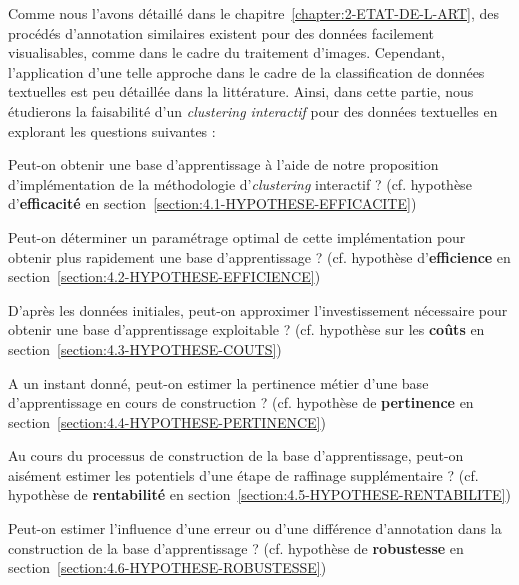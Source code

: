 	Comme nous l'avons détaillé dans le chapitre~\ref{chapter:2-ETAT-DE-L-ART}, des procédés d'annotation similaires existent pour des données facilement visualisables, comme dans le cadre du traitement d'images. Cependant, l'application d'une telle approche dans le cadre de la classification de données textuelles est peu détaillée dans la littérature. Ainsi, dans cette partie, nous étudierons la faisabilité d'un \textit{clustering interactif} pour des données textuelles en explorant les questions suivantes :
	\begin{leftBarImportantRed}
		\begin{todolist}
			\item Peut-on obtenir une base d'apprentissage à l'aide de notre proposition d'implémentation de la méthodologie d'\textit{clustering} interactif ? (cf. hypothèse d'\textbf{efficacité} en section~\ref{section:4.1-HYPOTHESE-EFFICACITE})
			\item Peut-on déterminer un paramétrage optimal de cette implémentation pour obtenir plus rapidement une base d'apprentissage ? (cf. hypothèse d'\textbf{efficience} en section~\ref{section:4.2-HYPOTHESE-EFFICIENCE})
			\item D'après les données initiales, peut-on approximer l'investissement nécessaire pour obtenir une base d'apprentissage exploitable ? (cf. hypothèse sur les \textbf{coûts} en section~\ref{section:4.3-HYPOTHESE-COUTS})
			\item A un instant donné, peut-on estimer la pertinence métier d'une base d'apprentissage en cours de construction ? (cf. hypothèse de \textbf{pertinence} en section~\ref{section:4.4-HYPOTHESE-PERTINENCE})
			\item Au cours du processus de construction de la base d'apprentissage, peut-on aisément estimer les potentiels d'une étape de raffinage supplémentaire ? (cf. hypothèse de \textbf{rentabilité} en section~\ref{section:4.5-HYPOTHESE-RENTABILITE})
			\item Peut-on estimer l'influence d'une erreur ou d'une différence d'annotation dans la construction de la base d'apprentissage ? (cf. hypothèse de \textbf{robustesse} en section~\ref{section:4.6-HYPOTHESE-ROBUSTESSE})
		\end{todolist}
	\end{leftBarImportantRed}
	
